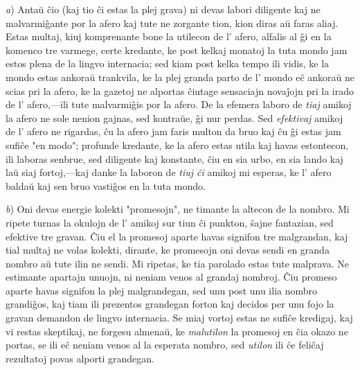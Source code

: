 \documentclass[12pt,twoside]{book}
\begin{document}
\emph{a}) Antaŭ ĉio (kaj tio ĉi estas la plej grava) ni devas labori diligente kaj ne malvarmiĝante por la afero kaj tute ne zorgante tion, kion diras aŭ faras aliaj. Estas multaj, kiuj komprenante bone la utilecon de l' afero, alfalis al ĝi en la komenco tre varmege, certe kredante, ke post kelkaj monatoj la tuta mondo jam estos plena de la lingvo internacia; sed kiam post kelka tempo ili vidis, ke la mondo estas ankoraŭ trankvila, ke la plej granda parto de l' mondo eĉ ankoraŭ ne scias pri la afero, ke la gazetoj ne alportas ĉiutage sensaciajn novaĵojn pri la irado de l' afero,—ili tute malvarmiĝis por la afero. De la efemera laboro de \emph{tiaj} amikoj la afero ne sole nenion gajnas, sed kontraŭe, ĝi nur perdas. Sed \emph{efektivaj} amikoj de l' afero ne rigardas, ĉu la afero jam faris multon da bruo kaj ĉu ĝi estas jam sufiĉe "en modo"; profunde kredante, ke la afero estas utila kaj havas estontecon, ili laboras senbrue, sed diligente kaj konstante, ĉiu en sia urbo, en sia lando kaj laŭ siaj fortoj,—kaj danke la laboron de \emph{tiuj ĉi} amikoj mi esperas, ke l' afero baldaŭ kaj sen bruo vastiĝos en la tuta mondo.

\emph{b}) Oni devas energie kolekti "promesojn", ne timante la altecon de la nombro. Mi ripete turnas la okulojn de l' amikoj sur tiun ĉi punkton, ŝajne fantazian, sed efektive tre gravan. Ĉiu el la promesoj aparte havas signifon tre malgrandan, kaj tial multaj ne volas kolekti, dirante, ke promesojn oni devas sendi en granda nombro aŭ tute ilin ne sendi. Mi ripetas, ke tia parolado estas tute malprava. Ne estimante apartajn unuojn, ni neniam venos al grandaj nombroj. Ĉiu promeso aparte havas signifon la plej malgrandegan, sed unu post unu ilia nombro grandiĝos, kaj tiam ili prezentos grandegan forton kaj decidos per unu fojo la gravan demandon de lingvo internacia. Se miaj vortoj estas ne sufiĉe kredigaj, kaj vi restas skeptikaj, ne forgesu almenaŭ, ke \emph{malutilon} la promesoj en ĉia okazo ne portas, se ili eĉ neniam venos al la esperata nombro, sed \emph{utilon} ili ĉe feliĉaj rezultatoj povas alporti grandegan.
\end{document}

